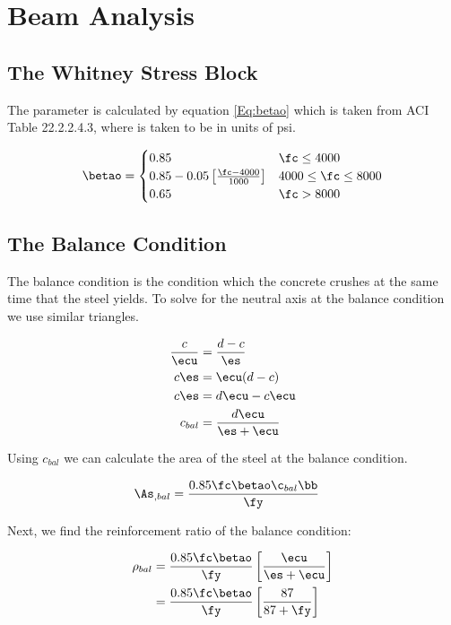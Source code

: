 
\section{Beam Analysis}
\subsection{The Whitney Stress Block}

The parameter \betao is calculated by equation \ref{Eq:betao} which is taken from ACI Table 22.2.2.4.3, where \fc  is taken to be in units of psi.

\begin{align}
	\betao
	=
	\begin{cases}
		0.85 & \fc \leq 4000 \\
		0.85-0.05\left[\frac{\fc-4000}{1000}\right] & 4000 \leq\fc\leq 8000 \\
		0.65 & \fc > 8000
	\end{cases}
	\label{Eq:betao}
\end{align}



\subsection{The Balance Condition}

The balance condition is the condition which the concrete crushes at the same time that the steel yields. To solve for the neutral axis at the balance condition we use similar triangles.

\begin{align}
	\frac{c}{\ecu} &= \frac{d-c}{\es}\\ 
	c \es &= \ecu(d-c)\\ 
	c \es &= d\ecu -c\ecu\\ 
	c_{bal} &= \frac{d\ecu}{\es+\ecu}
\end{align}


Using $c_{bal}$ we can calculate the area of the steel \As at the balance condition.

\begin{align}
	\As_{,bal} &= \frac{0.85\fc\betao\c_{bal}\bb}{\fy}
\end{align}

Next, we find the reinforcement ratio of the balance condition:

\begin{align}
	\rho_{bal} &= \frac{0.85\fc\betao}{\fy}
	\left[
		\frac{\ecu}{\es+\ecu}
	\right]\\
	&= 
	\frac{0.85\fc\betao}{\fy}
	\left[
		\frac{87}{87+\fy}
	\right]
\end{align}




